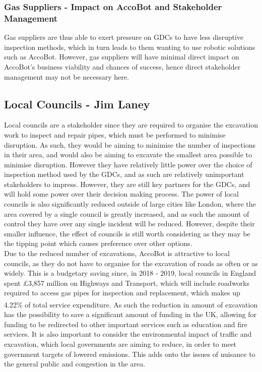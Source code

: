 \documentclass[11pt]{article}		%
\newcommand{\supercite}[1]{\textsuperscript{\cite{#1}}}		%
\begin{document}
		\subsubsection{Gas Suppliers - Impact on AccoBot and Stakeholder Management}
		Gas suppliers are thus able to exert pressure on GDCs to have less disruptive inspection methods, which in turn leads to them wanting to use robotic solutions such as AccoBot. However, gas suppliers will have minimal direct impact on AccoBot’s business viability and chances of success, hence direct stakeholder management may not be necessary here. 
		\subsection[Local Councils]{Local Councils - Jim Laney}
			
			Local councils are a stakeholder since they are required to organise the excavation work to inspect and repair pipes, which must be performed to minimise disruption.
			As such, they would be aiming to minimise the number of inspections in their area, and would also be aiming to excavate the smallest area possible to minimise disruption.
			However they have relatively little power over the choice of inspection method used by the GDCs, and as such are relatively unimportant stakeholders to impress.
			However, they are still key partners for the GDCs, and will hold some power over their decision making process.
			The power of local councils is also significantly reduced outside of large cities like London, where the area covered by a single council is greatly increased, and as such the amount of control they have over any single incident will be reduced.
			However, despite their smaller influence, the effect of councils is still worth considering as they may be the tipping point which causes preference over other options.
			\\
			Due to the reduced number of excavations, AccoBot is attractive to local councils, as they do not have to organise for the excavation of roads as often or as widely.
			This is a budgetary saving since, in 2018 - 2019, local councils in England spent £3,857 million on Highways and Transport, which will include roadworks required to access gas pipes for inspection and replacement, which makes up 4.22\% of total service expenditure\supercite{ministry2020local}.
			As such the reduction in amount of excavation has the possibility to save a significant amount of funding in the UK, allowing for funding to be redirected to other important services such as education and fire services.
			It is also important to consider the environmental impact of traffic and excavation, which local governments are aiming to reduce, in order to meet government targets of lowered emissions.
			This adds onto the issues of nuisance to the general public and congestion in the area.
		
\end{document}

